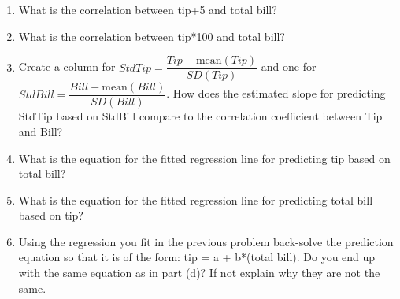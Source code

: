 \documentclass[10pt]{article}
\begin{document}
\begin{enumerate}
\begin{enumerate}
        \item What is the correlation between tip+5 and total bill?
        \item What is the correlation between tip*100 and total bill?
        \item Create a column for $Std Tip = \dfrac{Tip - \text{mean}(Tip)}{SD(Tip)}$ and one for $Std Bill = \dfrac{Bill - \text{mean}(Bill)}{SD(Bill)}$. How does the estimated slope for predicting StdTip based on StdBill compare to the correlation coefficient between Tip and Bill?
        \item What is the equation for the fitted regression line for predicting tip based on total bill? 
        \item What is the equation for the fitted regression line for predicting total bill based on tip?
        \item Using the regression you fit in the previous problem back-solve the prediction equation so that it is of the form: tip = a + b*(total bill).  Do you end up with the same equation as in part (d)?  If not explain why they are not the same.

    \end{enumerate}        

\end{enumerate} %
\end{document}

